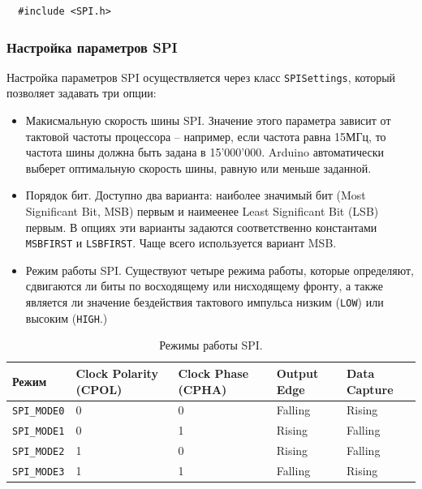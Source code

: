 \documentclass[../sparc.tex]{subfiles}
\begin{document}
\begin{verbatim}
  #include <SPI.h>
\end{verbatim}

\subsubsection{Настройка параметров SPI}

Настройка параметров SPI осуществляется через класс
\texttt{SPISettings}, который позволяет задавать три опции:

\begin{itemize}
\item Макисмальную скорость шины SPI.  Значение этого параметра зависит от
  тактовой частоты процессора -- например, если частота равна 15МГц, то частота
  шины должна быть задана в 15'000'000.  Arduino автоматически выберет
  оптимальную скорость шины, равную или меньше заданной.
\item Порядок бит.  Доступно два варианта: наиболее значимый бит (Most
  Significant Bit, MSB) первым и наимеенее Least Significant Bit (LSB) первым.
  В опциях эти варианты задаются соответственно константами
  \texttt{MSBFIRST} и \texttt{LSBFIRST}.  Чаще всего
  используется вариант MSB.
\item Режим работы SPI.  Существуют четыре режима работы, которые определяют,
  сдвигаются ли биты по восходящему или нисходящему фронту, а также является ли
  значение бездействия тактового импульса низким (\texttt{LOW}) или высоким
  (\texttt{HIGH}.)
\end{itemize}

\begin{table}[H]
  \small
  \centering
  \begin{tabular}{ | m{1.75cm} | m{1cm} | m{1cm} | m{1cm} | m{1cm} | }
    \hline
    \textbf{Режим}
    & \textbf{Clock Polarity (CPOL)}
    & \textbf{Clock Phase (CPHA)}
    & \textbf{Output Edge}
    & \textbf{Data Capture} \\
    \hline
    \texttt{SPI\_MODE0} & 0 & 0 & Falling & Rising \\
    \hline
    \texttt{SPI\_MODE1} & 0 & 1 & Rising & Falling \\
    \hline
    \texttt{SPI\_MODE2} & 1 & 0 & Rising & Falling \\
    \hline
    \texttt{SPI\_MODE3} & 1 & 1 & Falling & Rising \\
    \hline
  \end{tabular}
  \caption{Режимы работы SPI.}
  \label{table:spi-modes}
\end{table}
\end{document}
